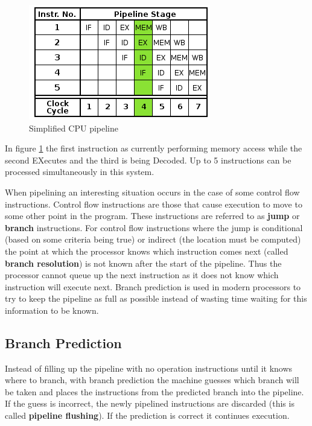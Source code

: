 \documentclass[english,a4paper,12pt]{report}
\begin{document}
\begin{figure}[tph]
  \centering
  \includegraphics[scale=0.5]{pipeline}
  \caption[Simplified CPU pipeline]{Simplified CPU pipeline \cite{pipeline}}
  \label{fig:pipeline}
\end{figure}

In figure \ref{fig:pipeline} the first instruction as
currently performing memory access while the second EXecutes and the
third is being Decoded. Up to 5 instructions can be processed
simultaneously in this system.

When pipelining an interesting situation occurs in the case of some
control flow instructions. Control flow instructions are those that
cause execution to move to some other point in the program. These
instructions are referred to as \textbf{jump} or \textbf{branch}
instructions. For control flow instructions where the jump is
conditional (based on some criteria being true) or indirect (the
location must be computed) the point at which the processor knows
which instruction comes next (called \textbf{branch resolution}) is
not known after the start of the pipeline. Thus the processor cannot
queue up the next instruction as it does not know which instruction
will execute next. Branch prediction is used in modern processors to
try to keep the pipeline as full as possible instead of wasting time
waiting for this information to be known.

\subsection{Branch Prediction}

Instead of filling up the pipeline with no operation instructions
until it knows where to branch, with branch prediction the machine
guesses which branch will be taken and places the instructions from
the predicted branch into the pipeline. If the guess is incorrect, the
newly pipelined instructions are discarded (this is called \textbf{pipeline
  flushing}). If the prediction is correct it continues execution.
\end{document}
